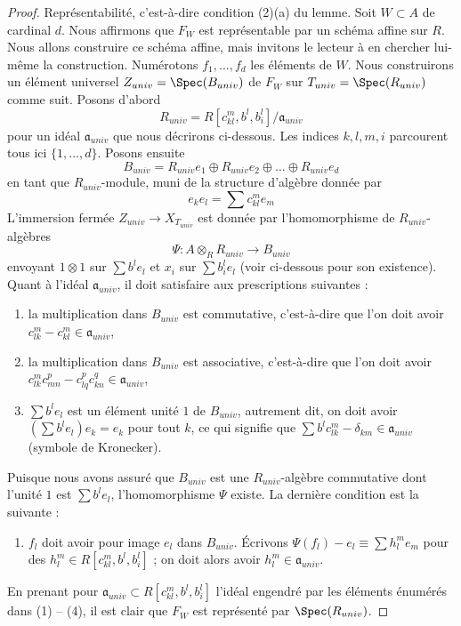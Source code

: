 \begin{proof}
\medskip\noindent
Représentabilité, c'est-à-dire condition (2)(a) du lemme. Soit $W \subset A$
de cardinal $d$. Nous affirmons que $F_W$ est représentable par un schéma
affine sur $R$. Nous allons construire ce schéma affine, mais invitons
le lecteur à en chercher lui-même la construction. Numérotons
$f_1, \ldots, f_d$ les éléments de $W$. Nous construirons un élément
universel $Z_{univ} = \Spec(B_{univ})$ de $F_W$ sur $T_{univ} = \Spec(R_{univ})$
comme suit. Posons d'abord
$$
R_{univ} = R[c_{kl}^m, b^l, b_i^l]/\mathfrak a_{univ}
$$
pour un idéal $\mathfrak a_{univ}$ que nous décrirons ci-dessous.
Les indices $k, l, m, i$ parcourent tous ici $\{1, \ldots, d\}$.
Posons ensuite
$$
B_{univ} = R_{univ}e_1 \oplus R_{univ}e_2 \oplus \ldots \oplus R_{univ}e_d
$$
en tant que $R_{univ}$-module, muni de la structure d'algèbre donnée par
$$
e_ke_l = \sum c_{kl}^m e_m
$$
L'immersion fermée $Z_{univ} \to X_{T_{univ}}$ est donnée
par l'homomorphisme de $R_{univ}$-algèbres
$$
\Psi : A \otimes_R R_{univ} \longrightarrow B_{univ}
$$
envoyant $1 \otimes 1$ sur $\sum b^le_l$ et $x_i$ sur $\sum b_i^le_l$
(voir ci-dessous pour son existence). Quant à l'idéal $\mathfrak a_{univ}$,
il doit satisfaire aux prescriptions suivantes :
\begin{enumerate}
\item la multiplication dans $B_{univ}$ est commutative, c'est-à-dire que
l'on doit avoir $c_{lk}^m - c_{kl}^m \in \mathfrak a_{univ}$,
\item la multiplication dans $B_{univ}$ est associative, c'est-à-dire que
l'on doit avoir $c_{lk}^m c_{m n}^p - c_{lq}^p c_{kn}^q \in \mathfrak a_{univ}$,
\item $\sum b^le_l$ est un élément unité $1$ de $B_{univ}$,
autrement dit, on doit avoir $(\sum b^le_l)e_k = e_k$ pour tout $k$,
ce qui signifie que $\sum b^lc_{lk}^m - \delta_{km} \in \mathfrak a_{univ}$
(symbole de Kronecker).
\end{enumerate}
Puisque nous avons assuré que $B_{univ}$ est une
$R_{univ}$-algèbre commutative dont l'unité $1$ est $\sum b^le_l$, l'homomorphisme $\Psi$
existe. La dernière condition est la suivante :
\begin{enumerate}
\item[(4)] $f_l$ doit avoir pour image $e_l$ dans $B_{univ}$. Écrivons
$\Psi(f_l) - e_l \equiv \sum h_l^me_m$ pour des
$h_l^m \in R[c_{kl}^m, b^l, b_i^l]$ ;
on doit alors avoir $h_l^m \in \mathfrak a_{univ}$.
\end{enumerate}
En prenant pour $\mathfrak a_{univ} \subset R[c_{kl}^m, b^l, b_i^l]$ l'idéal engendré
par les éléments énumérés dans (1) -- (4),
il est clair que $F_W$ est représenté par $\Spec(R_{univ})$.
\end{proof}


